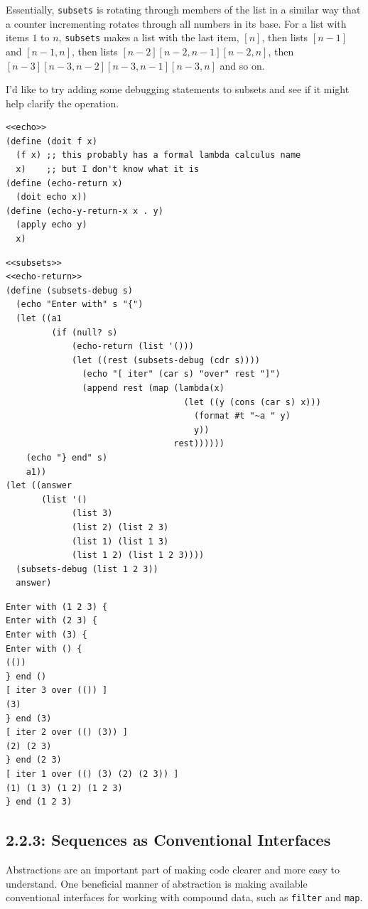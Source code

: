 \documentclass[final,fleqn,titlepage,twoside]{article}
\begin{document}
Essentially, \texttt{subsets} is rotating through members of the list in a
similar way that a counter incrementing rotates through all numbers in its base.
For a list with items \(1\) to \(n\), \texttt{subsets} makes a list with the
last item, \([n]\), then lists \([n-1]\) and \([n-1, n]\), then lists
\([n-2][n-2, n-1][n-2,n]\), then \([n-3][n-3,n-2][n-3,n-1][n-3,n]\) and so on.

I'd like to try adding some debugging statements to subsets and see if it might
help clarify the operation.

\begin{verbatim}
<<echo>>
(define (doit f x)
  (f x) ;; this probably has a formal lambda calculus name
  x)    ;; but I don't know what it is
(define (echo-return x)
  (doit echo x))
(define (echo-y-return-x x . y)
  (apply echo y)
  x)
\end{verbatim}
\begin{verbatim}
<<subsets>>
<<echo-return>>
(define (subsets-debug s)
  (echo "Enter with" s "{")
  (let ((a1
         (if (null? s)
             (echo-return (list '()))
             (let ((rest (subsets-debug (cdr s))))
               (echo "[ iter" (car s) "over" rest "]")
               (append rest (map (lambda(x)
                                   (let ((y (cons (car s) x)))
                                     (format #t "~a " y)
                                     y))
                                 rest))))))
    (echo "} end" s)
    a1))
(let ((answer
       (list '()
             (list 3)
             (list 2) (list 2 3)
             (list 1) (list 1 3)
             (list 1 2) (list 1 2 3))))
  (subsets-debug (list 1 2 3))
  answer)
\end{verbatim}

\begin{verbatim}
Enter with (1 2 3) { 
Enter with (2 3) { 
Enter with (3) { 
Enter with () { 
(()) 
} end () 
[ iter 3 over (()) ] 
(3) 
} end (3) 
[ iter 2 over (() (3)) ] 
(2) (2 3) 
} end (2 3) 
[ iter 1 over (() (3) (2) (2 3)) ] 
(1) (1 3) (1 2) (1 2 3) 
} end (1 2 3) 
\end{verbatim}

\subsection{2.2.3: Sequences as Conventional Interfaces}
\label{sec:orgee3e28c}
Abstractions are an important part of making code clearer and more easy to
understand. One beneficial manner of abstraction is making available
conventional interfaces for working with compound data, such as
\texttt{filter} and \texttt{map}.
\end{document}
